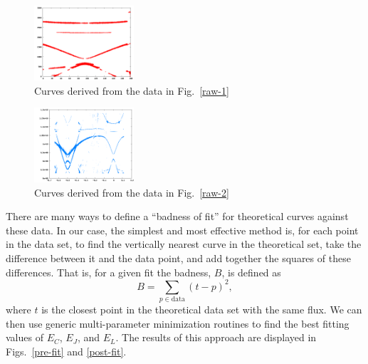 \documentclass[twocolumn]{revtex4}
\newcommand{\figwidth}{0.33\textwidth}
\begin{document}
\begin{figure}
\includegraphics[width=\figwidth]{colorful-points.png}
\caption{ Curves derived from the data in Fig.~\ref{raw-1} }
\label{filter-1}
\end{figure}

\begin{figure}
\includegraphics[width=\figwidth]{CPBL-data.png}
\caption{ Curves derived from the data in Fig.~\ref{raw-2} }
\label{filter-2}
\end{figure}

There are many ways to define a ``badness of fit'' for theoretical
curves against these data. In our case, the simplest and most
effective method is, for each point in the data set, to find the
vertically nearest curve in the theoretical set, take the difference
between it and the data point, and add together the squares of these
differences. That is, for a given fit the badness, $B$, is defined as
\begin{equation}
\label{badness}
B = \sum_{p \in \text{data}} (t-p)^2,
\end{equation}
where $t$ is the closest point in the theoretical data set with the
same flux. We can then use generic multi-parameter minimization
routines to find the best fitting values of $E_C$, $E_J$, and
$E_L$.\cite{Byrd}\cite{Zhu} The results of this approach are displayed
in Figs.~\ref{pre-fit} and \ref{post-fit}.
\end{document}

